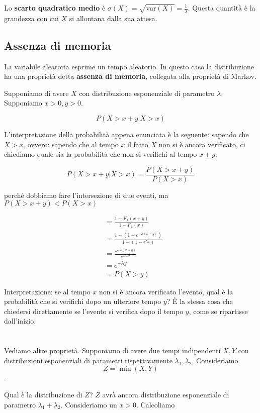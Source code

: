 \documentclass[a4paper,12pt]{book}
\newcommand\ddfrac[2]{\frac{\displaystyle #1}{\displaystyle #2}}
\begin{document}
Lo \textbf{scarto quadratico medio} è $\sigma(X) = \sqrt{\text{var}(X)} = \ddfrac{1}{\lambda}$. %
Questa quantità è la grandezza con cui $ X $ si allontana dalla sua attesa. 

\subsection{Assenza di memoria}

La variabile aleatoria esprime un tempo aleatorio. In questo caso la distribuzione ha una proprietà detta \textbf{assenza di memoria}, collegata alla proprietà di Markov. 

Supponiamo di avere $ X $ con distribuzione esponenziale di parametro $\lambda$. Supponiamo $ x > 0, y > 0 $.

$$ P(X > x + y | X > x) $$

L'interpretazione della probabilità appena enunciata è la seguente: sapendo che $ X > x $, ovvero: sapendo che al tempo $ x $ il fatto $ X $ non si è ancora verificato, ci chiediamo quale sia la probabilità che non si verifichi al tempo $ x+y $:

$$ P(X > x + y | X > x) = \frac{P(X>x+y)}{P(X > x)}$$

perché dobbiamo fare l'intersezione di due eventi, ma $ P(X>x+y) < P(X>x) $

\begin{align*}
	& = \frac{1 - F_\lambda (x+y)}{1-F_\lambda(x)} \\
	& = \frac{1- (1-e^{-\lambda(x+y)})}{1-(1-e^{\lambda x})} \\
	& = \frac{e^{-\lambda(x+y)}}{e^{-\lambda x}} \\
	& = e^{-\lambda y} \\
	& = P(X > y)
\end{align*}

Interpretazione: se al tempo $ x $ non si è ancora verificato l'evento, qual è la probabilità che si verifichi dopo un ulteriore tempo $ y $? È la stessa cosa che chiedersi direttamente se l'evento si verifica dopo il tempo $ y $, come se ripartisse dall'inizio. 
\\
\\
\\
Vediamo altre proprietà. Supponiamo di avere due tempi indipendenti $ X, Y $ con distribuzioni esponenziali di parametri rispettivamente $\lambda_1, \lambda_2$. Consideriamo
$$ Z = \min(X, Y) $$.

Qual è la distribuzione di $ Z $? $ Z $ avrà ancora distribuzione esponenziale di parametro $ \lambda_1 + \lambda_2 $. Consideriamo un $ x > 0 $. Calcoliamo
\end{document}
